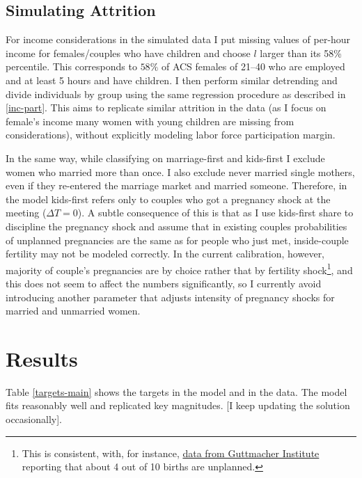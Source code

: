 \documentclass[12pt,letter]{article}
\begin{document}
\subsection{Simulating Attrition\label{income-attr}}
For income considerations in the simulated data I put missing values of per-hour income for females/couples who have children and choose $l$ larger than its 58\% percentile. This corresponds to $58\%$ of ACS females of 21--40 who are employed and at least 5 hours and have children. I then perform similar detrending and divide individuals by group using the same regression procedure as described in \ref{inc-part}. This aims to replicate similar attrition in the data (as I focus on female's income many women with young children are missing from considerations), without explicitly modeling labor force participation margin.

In the same way, while classifying on marriage-first and kids-first I exclude women who married more than once. I also exclude never married single mothers, even if they re-entered the marriage market and married someone. Therefore, in the model kids-first refers only to couples who got a pregnancy shock at the meeting ($\Delta T = 0$). A subtle consequence of this is that as I use kids-first share to discipline the pregnancy shock and assume that in existing couples probabilities of unplanned pregnancies are the same as for people who just met, inside-couple fertility may not be modeled correctly. In the current calibration, however, majority of couple's pregnancies are by choice rather that by fertility shock\footnote{This is consistent, with, for instance, \href{https://www.guttmacher.org/fact-sheet/unintended-pregnancy-united-states}{data from Guttmacher Institute} reporting that about 4 out of 10 births are unplanned.}, and this does not seem to affect the numbers significantly, so I currently avoid introducing another parameter that adjusts intensity of pregnancy shocks for married and unmarried women.

\section{Results}
Table \ref{targets-main} shows the targets in the model and in the data. The model fits reasonably well and replicated key magnitudes. [I keep updating the solution occasionally].
\end{document}
